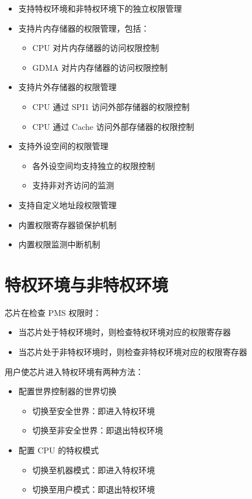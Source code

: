 \documentclass[main\_\_CN.tex]{subfiles}
\begin{document}
\begin{itemize}
    \item 支持特权环境和非特权环境下的独立权限管理
    \item 支持片内存储器的权限管理，包括：
    \begin{itemize}
        \item CPU 对片内存储器的访问权限控制
        \item GDMA 对片内存储器的访问权限控制
    \end{itemize}
    \item 支持片外存储器的权限管理
    \begin{itemize}
        \item CPU 通过 SPI1 访问外部存储器的权限控制
        \item CPU 通过 Cache 访问外部存储器的权限控制
    \end{itemize}
    \item 支持外设空间的权限管理
    \begin{itemize}
        \item 各外设空间均支持独立的权限控制
        \item 支持非对齐访问的监测
    \end{itemize}
    \item 支持自定义地址段权限管理
    \item 内置权限寄存器锁保护机制
    \item 内置权限监测中断机制
\end{itemize}

\section{特权环境与非特权环境}\label{sec:permctrl-privileged-mode}

\chipname{} 芯片在检查 PMS 权限时：
\begin{itemize}
    \item 当芯片处于特权环境时，则检查特权环境对应的权限寄存器
    \item 当芯片处于非特权环境时，则检查非特权环境对应的权限寄存器
\end{itemize}

用户使芯片进入特权环境有两种方法：

\begin{itemize}
    \item 配置世界控制器的世界切换
    \begin{itemize}
        \item 切换至安全世界：即进入特权环境
        \item 切换至非安全世界：即退出特权环境
    \end{itemize}
    \item 配置 CPU 的特权模式
    \begin{itemize}
        \item 切换至机器模式：即进入特权环境
        \item 切换至用户模式：即退出特权环境
    \end{itemize}
\end{itemize}
\end{document}
